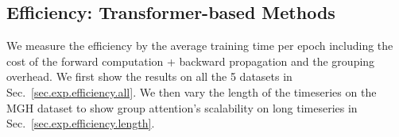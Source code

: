 \subsection{Efficiency: Transformer-based Methods}
\label{sec.exp.efficiency}
We measure the efficiency by the average training time per epoch including the cost of the forward computation + backward propagation and the grouping overhead. 
We first show the results on all the 5 datasets in Sec.~\ref{sec.exp.efficiency.all}. We then vary the length of the timeseries on the MGH dataset to show group attention's scalability on long timeseries in Sec.~\ref{sec.exp.efficiency.length}. 

